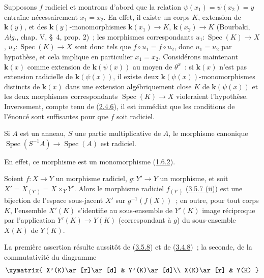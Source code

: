 Supposons $f$ radiciel et montrons d'abord que la relation
$\psi(x_1)=\psi(x_2)=y$ entraîne nécessairement $x_1=x_2$. En effet, il
existe un corps $K$, extension de $\boldsymbol{k}(y)$, et des $\boldsymbol{k}(y)$-monomorphismes
$\boldsymbol{k}(x_1)\to K$, $\boldsymbol{k}(x_2)\to K$ (Bourbaki, \emph{Alg.}, chap. V, \S~4,
prop. 2)~; les morphismes correspondants
$u_1:\operatorname{Spec}(K)\to X$, $u_2:\operatorname{Spec}(K)\to X$ sont
donc tels que $f\circ u_1=f\circ u_2$, donc $u_1=u_2$ par hypothèse, et cela
implique en particulier $x_1=x_2$. Considérons maintenant $\boldsymbol{k}(x)$ comme
extension de $\boldsymbol{k}(\psi(x))$ au moyen de $\theta^x$~: si $\boldsymbol{k}(x)$ n'est pas
extension radicielle de $\boldsymbol{k}(\psi(x))$, il existe deux
$\boldsymbol{k}(\psi(x))$-monomorphismes distincts de $\boldsymbol{k}(x)$ dans une extension
algébriquement close $K$ de $\boldsymbol{k}(\psi(x))$ et les deux morphismes correspondants
$\operatorname{Spec}(K)\to X$ violeraient l'hypothèse. Inversement, compte
tenu de (\hyperref[I.2.4.6-fr]{2.4.6}), il est immédiat que les conditions de
l'énoncé sont suffisantes pour que $f$ soit radiciel.

\begin{corollary}[3.5.9]
\label{I.3.5.9-fr}
Si $A$ est un anneau, $S$ une partie multiplicative de $A$, le morphisme
canonique $\operatorname{Spec}(S^{-1}A)\to\operatorname{Spec}(A)$ est
radiciel.
\end{corollary}

En effet, ce morphisme est un monomorphisme
(\hyperref[I.1.6.2-fr]{1.6.2}).

\begin{corollary}[3.5.10]
\label{I.3.5.10-fr}
Soient $f:X\to Y$ un morphisme radiciel, $g:Y'\to Y$ un morphisme, et soit
$X'=X_{(Y')}=X\times_Y Y'$. Alors le morphisme radiciel $f_{(Y')}$
\textup{(\hyperref[I.3.5.7-fr]{3.5.7 (ii)})} est une bijection de l'espace sous-jacent
$X'$ sur $g^{-1}(f(X))$~; en outre, pour tout corps $K$, l'ensemble $X'(K)$
s'identifie au sous-ensemble de $Y'(K)$ image réciproque par l'application
$Y'(K)\to Y(K)$ (correspondant à $g$) du sous-ensemble $X(K)$ de $Y(K)$.
\end{corollary}

La première assertion résulte aussitôt de
(\hyperref[I.3.5.8-fr]{3.5.8}) et de
(\hyperref[I.3.4.8-fr]{3.4.8})~; la seconde, de la commutativité du diagramme
\label{I.3.5.10.base-change-points-diagram-fr}
\[
  \xymatrix{
    X'(K)\ar[r]\ar[d] & Y'(K)\ar[d]\\
    X(K)\ar[r] & Y(K)
  }
\]

